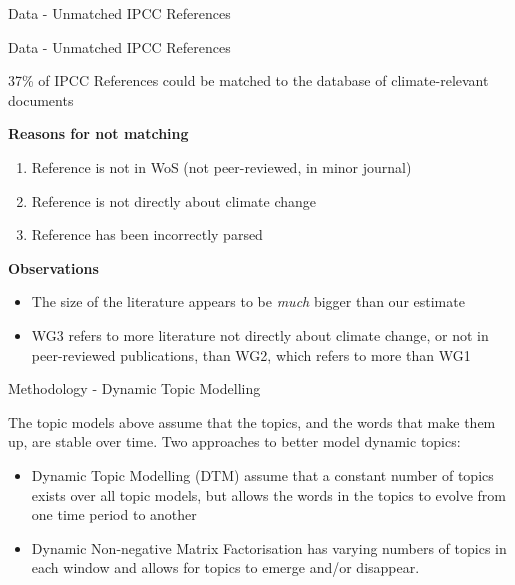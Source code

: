\documentclass[9pt]{beamer}
\begin{document}
\begin{frame}{Data - Unmatched IPCC References}
	\tiny
	
\end{frame}

\begin{frame}{Data - Unmatched IPCC References}

37\% of IPCC References could be matched to the database of climate-relevant documents

\medskip

\textbf{Reasons for not matching}
\begin{enumerate}
	\item<2->Reference is not in WoS (not peer-reviewed, in minor journal)
	\item<3->Reference is not directly about climate change
	\item<4->Reference has been incorrectly parsed
\end{enumerate}

\medskip

\textbf{Observations}
\begin{itemize}
	\item<5-> The size of the literature appears to be \textit{much} bigger than our estimate
	\item<6-> WG3 refers to more literature not directly about climate change, or not in peer-reviewed publications, than WG2, which refers to more than WG1
\end{itemize}

\end{frame}

\begin{frame}{Methodology - Dynamic Topic Modelling}

The topic models above assume that the topics, and the words that make them up, are stable over time. Two approaches to better model dynamic topics:

\begin{itemize}
	\item<2->Dynamic Topic Modelling (DTM) \citep{Blei2006} assume that a constant number of topics exists over all topic models, but allows the words in the topics to evolve from one time period to another
	\item<3->Dynamic Non-negative Matrix Factorisation \citep{Greene2016} has varying numbers of topics in each window and allows for topics to emerge and/or disappear.
\end{itemize}


\end{frame}
\end{document}
